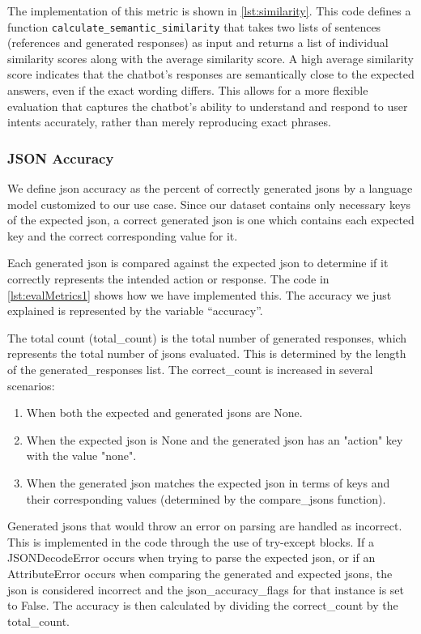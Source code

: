 The implementation of this metric is shown in \cref{lst:similarity}. This code defines a function \texttt{calculate\_semantic\_similarity} that takes two lists of sentences (references and generated responses) as input and returns a list of individual similarity scores along with the average similarity score.
A high average similarity score indicates that the chatbot's responses are semantically close to the expected answers, even if the exact wording differs. This allows for a more flexible evaluation that captures the chatbot's ability to understand and respond to user intents accurately, rather than merely reproducing exact phrases.


\subsubsection{JSON Accuracy}
We define \gls{json} accuracy as the percent of correctly generated \glspl{json} by a language model customized to our use case.
Since our dataset contains only necessary keys of the expected \gls{json}, a correct generated \gls{json} is one which contains each expected key and the correct corresponding value for it.

Each generated \gls{json} is compared against the expected \gls{json} to determine if it correctly represents the intended action or response. 
The code in \cref{lst:evalMetrics1} shows how we have implemented this. The accuracy we just explained is represented by the variable ``accuracy''.

The total count (total\_count) is the total number of generated responses, which represents the total number of \glspl{json} evaluated. This is determined by the length of the generated\_responses list.
The correct\_count is increased in several scenarios:
\begin{enumerate}
    \item When both the expected and generated \glspl{json} are None.
    \item When the expected \gls{json} is None and the generated \gls{json} has an "action" key with the value "none".
    \item When the generated \gls{json} matches the expected \gls{json} in terms of keys and their corresponding values (determined by the compare\_jsons function).
\end{enumerate}
Generated \glspl{json} that would throw an error on parsing are handled as incorrect. This is implemented in the code through the use of try-except blocks. If a JSONDecodeError occurs when trying to parse the expected \gls{json}, or if an AttributeError occurs when comparing the generated and expected \glspl{json}, the \gls{json} is considered incorrect and the json\_accuracy\_flags for that instance is set to False.
The accuracy is then calculated by dividing the correct\_count by the total\_count.

